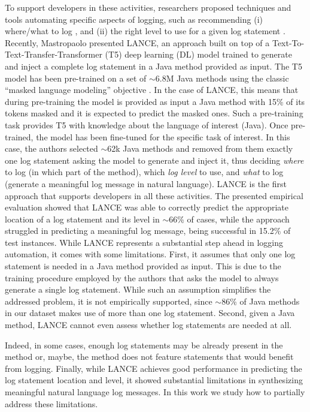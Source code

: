 To support developers in these activities, researchers proposed techniques and tools automating specific aspects of logging, such as recommending (i) where/what to log \cite{yuan2010sherlog,jia2018smartlog,li2018studying,harty2021logging,li2020shall}, and (ii) the right level to use for a given log statement \cite{yuan2012characterizing,oliner2012advances,li2017log,li2020qualitative,li2021deeplv}. Recently, Mastropaolo \etal \cite{mastropaolo2022using} presented LANCE, an approach built on top of a Text-To-Text-Transfer-Transformer (T5) deep learning (DL) model \cite{raffel2019exploring} trained to generate and inject a complete log statement in a Java method provided as input. The T5 model has been pre-trained on a set of $\sim$6.8M Java methods using the classic ``masked language modeling'' objective \cite{raffel2019exploring}. In the case of LANCE, this means that during pre-training the model is provided as input a Java method with 15\% of its tokens masked and it is expected to predict the masked ones. Such a pre-training task provides T5 with knowledge about the language of interest (\ie Java). Once pre-trained, the model has been fine-tuned for the specific task of interest. In this case, the authors selected $\sim$62k Java methods and removed from them exactly one log statement asking the model to generate and inject it, thus deciding \emph{where} to log (\ie in which part of the method), which \emph{log level} to use, and \emph{what} to log (\ie generate a meaningful log message in natural language). LANCE is the first approach that supports developers in all these activities. The presented empirical evaluation showed that LANCE was able to correctly predict the appropriate location of a log statement and its level in $\sim$66\% of cases, while the approach struggled in predicting a meaningful log message, being successful in 15.2\% of test instances. While LANCE represents a substantial step ahead in logging automation, it comes with some limitations. First, it assumes that only one log statement is needed in a Java method provided as input. This is due to the training procedure employed by the authors that asks the model to always generate a single log statement. While such an assumption simplifies the addressed problem, it is not empirically supported, since $\sim$86\% of Java methods in our dataset makes use of more than one log statement. Second, given a Java method, LANCE cannot even assess whether log statements are needed at all. 

\eject

Indeed, in some cases, enough log statements may be already present in the method or, maybe, the method does not feature statements that would benefit from logging. Finally,  while LANCE achieves good performance in predicting the log statement location and level, it showed substantial limitations in synthesizing meaningful natural language log messages. In this work we study how to partially address these limitations.

